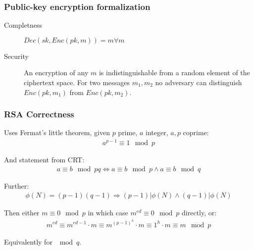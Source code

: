 \subsubsection{Public-key encryption formalization}

\begin{description}
		\item[Completness] $Dec(sk, Enc(pk, m)) = m \forall m$
		\item[Security] An encryption of any $m$ is indistinguishable from a random
				element of the ciphertext space. For two messages $m_1, m_2$ no
				adversary can distinguish $Enc(pk, m_1)$ from $Enc(pk, m_2)$.
\end{description}

\subsubsection{RSA Correctness}

Uses Fermat's little theorem, given $p$ prime, $a$ integer, $a, p$ coprime:
\begin{align*}
		a^{p-1} \equiv 1 \mod p
\end{align*}

And statement from CRT:
\begin{align*}
		a \equiv b \mod pq \Leftrightarrow a \equiv b \mod p \land a \equiv b \mod q
\end{align*}

Further:
\begin{align*}
		\phi(N) = (p - 1)(q - 1) \Rightarrow (p - 1) | \phi(N) \land (q - 1) | \phi(N)
\end{align*}

Then either $m \equiv 0 \mod p$ in which case $m^{ed} \equiv 0 \mod p$
directly, or:
\begin{align*}
		m^{ed} \equiv m^{ed - 1} \cdot m \equiv m^{(p-1)^h} \cdot m \equiv 1^h \cdot m \equiv m \mod p
\end{align*}

Equivalently for $\mod q$.
